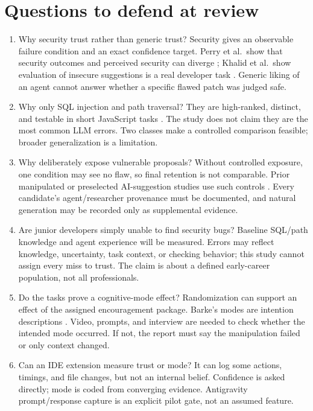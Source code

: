 \documentclass[12pt,a4paper]{article}
\begin{document}
\section{Questions to defend at review}
\begin{enumerate}[label=Q\arabic*.,leftmargin=2.5em]
  \item Why security trust rather than generic trust? Security gives an observable failure condition and an exact confidence target. Perry et al.\ show that security outcomes and perceived security can diverge \cite{perry2023}; Khalid et al.\ show evaluation of insecure suggestions is a real developer task \cite{khalid2026}. Generic liking of an agent cannot answer whether a specific flawed patch was judged safe.
  \item Why only SQL injection and path traversal? They are high-ranked, distinct, and testable in short JavaScript tasks \cite{mitre2024}. The study does not claim they are the most common LLM errors. Two classes make a controlled comparison feasible; broader generalization is a limitation.
  \item Why deliberately expose vulnerable proposals? Without controlled exposure, one condition may see no flaw, so final retention is not comparable. Prior manipulated or preselected AI-suggestion studies use such controls \cite{oh2024,serafini2025,khalid2026}. Every candidate's agent/researcher provenance must be documented, and natural generation may be recorded only as supplemental evidence.
  \item Are junior developers simply unable to find security bugs? Baseline SQL/path knowledge and agent experience will be measured. Errors may reflect knowledge, uncertainty, task context, or checking behavior; this study cannot assign every miss to trust. The claim is about a defined early-career population, not all professionals.
  \item Do the tasks prove a cognitive-mode effect? Randomization can support an effect of the assigned encouragement package. Barke's modes are intention descriptions \cite{barke2022}. Video, prompts, and interview are needed to check whether the intended mode occurred. If not, the report must say the manipulation failed or only context changed.
  \item Can an IDE extension measure trust or mode? It can log some actions, timings, and file changes, but not an internal belief. Confidence is asked directly; mode is coded from converging evidence. Antigravity prompt/response capture is an explicit pilot gate, not an assumed feature.

\end{enumerate}
\end{document}
